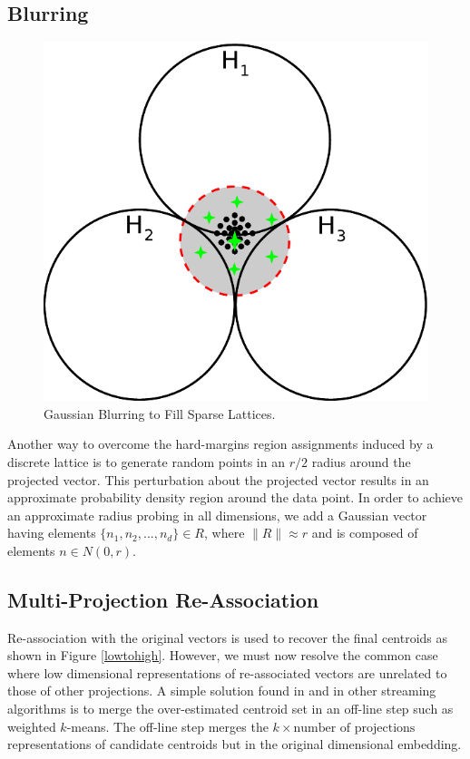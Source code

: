 \subsection{Blurring}

\begin{figure}
  \centerline{\includegraphics[width=.5\textwidth]{figs/blurring}}
  \caption{Gaussian Blurring to Fill Sparse Lattices.}\label{blurring}
\end{figure}

Another way to overcome the hard-margins region assignments induced by a discrete lattice is to generate random points
in an $r/2$ radius around the projected vector.  This perturbation about the projected vector results in an approximate
probability density region around the data point.  In order to achieve an approximate radius probing in all dimensions,
we add a Gaussian vector having elements $\{n_1, n_2, ..., n_d\}\in R$, where $\|R\|\approx r$ and is composed of
elements $n \in N(0,r)$.

\subsection{Multi-Projection Re-Association}\label{occultationSection}

Re-association with the original vectors is used to recover the final centroids as shown in Figure \ref{lowtohigh}.
However, we must now resolve the common case where low dimensional representations of re-associated vectors are
unrelated to those of other projections.  A simple solution found in \cite{braverman} and in other streaming algorithms
is to merge the over-estimated centroid set in an off-line step such as weighted $k$-means.  The off-line step merges
the $k\times \text{number of projections}$ representations of candidate centroids but in the original dimensional
embedding.

